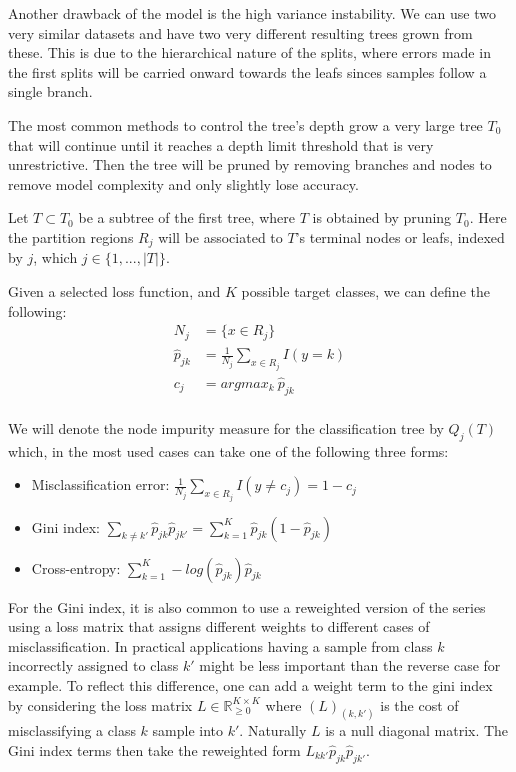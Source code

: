 Another drawback of the model is the high variance instability. We can use two very similar datasets and have two very different resulting trees grown from these. This is due to the hierarchical nature of the splits, where errors made in the first splits will be carried onward towards the leafs sinces samples follow a single branch.

The most common methods to control the tree's depth grow a very large tree $T_0$ that will continue until it reaches a depth limit threshold that is very unrestrictive. Then the tree will be pruned by removing branches and nodes to remove model complexity and only slightly lose accuracy. 

Let $T \subset T_0$ be a subtree of the first tree, where $T$ is obtained by pruning $T_0$.  Here the partition regions $R_j$ will be associated to $T$'s terminal nodes or leafs, indexed by $j$, which $j \in \{1,...,|T|  \}$. 

Given a selected loss function, and $K$ possible target classes, we can define the following:
\begin{equation}
\begin{split}
N_j & =  \{x \in R_j \}\\
\hat{p}_{jk} & = \frac{1}{N_j} \sum_{x \in R_j}  I(y=k)\\
c_j & =  argmax_{k} \  \hat{p}_{jk} \\
\end{split}
\end{equation}\label{decisionTreePruneParameters}

We will denote the node impurity measure for the classification tree by $Q_j(T)$ which, in the most used cases can take one of the following three forms:

\begin{itemize}
	\item Misclassification error: $ \displaystyle \frac{1}{N_j} \sum_{x \in R_j}  I(y\neq c_j)  = 1 - c_j $
	\item Gini index: $ \displaystyle \sum_{k\neq k'} \hat{p}_{jk} \hat{p}_{jk'}   = \sum_{k=1}^{K} \hat{p}_{jk} (1 - \hat{p}_{jk})  $
	\item Cross-entropy: $ \displaystyle \sum_{k=1}^{K} -log(\hat{p}_{jk})\hat{p}_{jk} $
\end{itemize}


For the Gini index, it is also common to use a reweighted version of the series using a loss matrix that assigns different weights to different cases of misclassification. In practical applications having a sample from class $k$ incorrectly assigned to class $k'$ might be less important than the reverse case for example. To reflect this difference, one can add a weight term to the gini index by considering the loss matrix $L \in \mathbb R_{\ge 0}^{K \times K}$ where $(L)_{(k,k')}$ is the cost of misclassifying a class $k$ sample into $k'$. Naturally $L$ is a null diagonal matrix.  The Gini index terms then take the reweighted form  $L_{kk'} \hat{p}_{jk} \hat{p}_{jk'}$.

